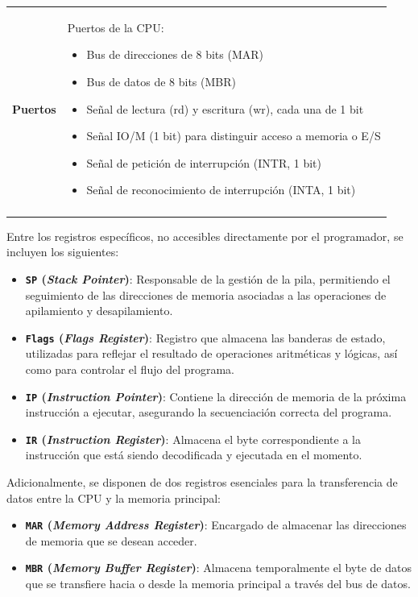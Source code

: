 \documentclass[12pt,oneside]{templates/unerthesis}
\providecommand{\tightlist}{%
  \setlength{\itemsep}{0pt}\setlength{\parskip}{0pt}}
\begin{document}
\begin{table}[!h]
{\begin{tabular}[t]{>{\raggedright\arraybackslash}p{4cm}|p{12cm}}
\addlinespace[10pt]
\addlinespace
\textbf{Puertos} & Puertos de la CPU:\begin{itemize} \item Bus de direcciones de 8 bits (MAR) \item Bus de datos de 8 bits (MBR) \item Señal de lectura (rd) y escritura (wr), cada una de 1 bit \item Señal IO/M (1 bit) para distinguir acceso a memoria o E/S \item Señal de petición de interrupción (INTR, 1 bit) \item Señal de reconocimiento de interrupción (INTA, 1 bit)\end{itemize}\\
\addlinespace[10pt]
\bottomrule
\end{tabular}}
\end{table}

Entre los registros específicos, no accesibles directamente por el programador, se incluyen los siguientes:

\begin{itemize}
\tightlist
\item
  \textbf{\texttt{SP} (\emph{Stack Pointer})}: Responsable de la gestión de la pila, permitiendo el seguimiento de las direcciones de memoria asociadas a las operaciones de apilamiento y desapilamiento.\\
\item
  \textbf{\texttt{Flags} (\emph{Flags Register})}: Registro que almacena las banderas de estado, utilizadas para reflejar el resultado de operaciones aritméticas y lógicas, así como para controlar el flujo del programa.\\
\item
  \textbf{\texttt{IP} (\emph{Instruction Pointer})}: Contiene la dirección de memoria de la próxima instrucción a ejecutar, asegurando la secuenciación correcta del programa.\\
\item
  \textbf{\texttt{IR} (\emph{Instruction Register})}: Almacena el byte correspondiente a la instrucción que está siendo decodificada y ejecutada en el momento.
\end{itemize}

Adicionalmente, se disponen de dos registros esenciales para la transferencia de datos entre la CPU y la memoria principal:

\begin{itemize}
\tightlist
\item
  \textbf{\texttt{MAR} (\emph{Memory Address Register})}: Encargado de almacenar las direcciones de memoria que se desean acceder.\\
\item
  \textbf{\texttt{MBR} (\emph{Memory Buffer Register})}: Almacena temporalmente el byte de datos que se transfiere hacia o desde la memoria principal a través del bus de datos.
\end{itemize}
\end{document}
